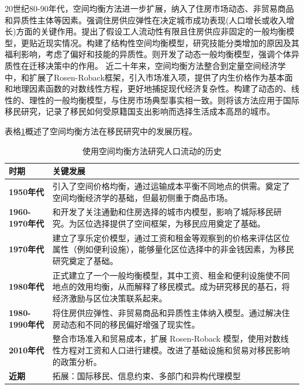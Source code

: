 \documentclass[a4paper, zihao=-4, fontset = mac, oneside]{ctexbook} %
\begin{document}
20世纪80-90年代，空间均衡方法进一步扩展，纳入了住房市场动态、非贸易商品和异质性主体等因素。\textcite{glaeserWealthCitiesAgglomeration2009}强调住房供应弹性在决定城市成功表现(人口增长或收入增长)方面的关键作用。\textcite{morettiLocalLaborMarkets2011}提出了假设工人流动性有限且住房供应非固定的一般均衡模型，更贴近现实情况。\textcite{diamondDeterminantsWelfareImplications2016}构建了结构性空间均衡模型，研究技能分类增加的原因及其福利影响，考虑了偏好和技能的异质性。\textcite{coen-piraniEffectHouseholdAppliances2010}则开发了动态一般均衡模型，强调个体异质性在迁移决策中的作用。
近二十年来，空间均衡方法整合到定量空间经济学中，\textcite{ahlfeldtEconomicsDensityEvidence2015}和\textcite{reddingQuantitativeSpatialEconomics2017}扩展了Rosen-Roback框架，引入市场准入项，提供了内生价格作为基本面和地理因素函数的对数线性方程，更好地捕捉现代经济复杂性。\textcite{glaeserHousingDynamicsUrban2014}构建了动态的、线性的、理性的一般均衡模型，与住房市场典型事实相一致。\textcite{albertImmigrationSpatialEquilibrium2022}则将该方法应用于国际移民研究，记录了移民如何受原籍国支出影响而选择生活成本高昂的城市。


表格\ref{tab:_history of spatial equilibrium on migratory problem}概述了空间均衡方法在移民研究中的发展历程。

\begin{table}[!ht]
\centering
\caption{使用空间均衡方法研究人口流动的历史}
\label{tab:_history of spatial equilibrium on migratory problem}
\begin{tabularx}{\textwidth}{@{}lX@{}}
\toprule
\textbf{时期} & \textbf{关键发展}\\
\midrule
\textbf{1950年代} & \textcite{samuelsonSpatialPriceEquilibrium1952}引入了空间价格均衡，通过运输成本平衡不同地点的供需。奠定了空间均衡经济学的基础，但最初侧重于商品市场。\\
\textbf{1960-1970年代} & \textcite{muthCitiesHousingSpatial1969}和\textcite{millsAggregativeModelResource1967}开发了关注通勤和住房选择的城市内模型，影响了城际移民研究。为区位选择提供了空间框架，为移民应用奠定了基础。\\
\textbf{1970年代} & \textcite{rosenHedonicPricesImplicit1974}建立了享乐定价模型，通过工资和租金等观察到的价格来评估区位属性（例如便利设施），能够量化区位选择中的非金钱因素，为移民研究奠定了基础。 \\
\textbf{1980年代} & \textcite{robackWagesRentsAmenities1988}正式建立了一个一般均衡模型，其中工资、租金和便利设施使不同地点的效用均衡，从而解释了移民模式。成为研究移民的基石，将经济激励与区位决策联系起来。\\
\textbf{1980-1990年代} & \textcite{glaeserWealthCitiesAgglomeration2009}将住房供应弹性、非贸易商品和异质性主体纳入模型。通过解决住房动态和不同的移民偏好增强了现实性。\\
\textbf{2010年代} & \cite{reddingQuantitativeSpatialEconomics2017}整合市场准入和贸易成本，扩展 Rosen-Roback 模型，使用对数线性方程对工资和人口进行建模。改进了基础设施和贸易对移民影响的政策分析。\\
\textbf{近期} & 拓展：国际移民、信息约束、多部门和异构代理模型 \\
\bottomrule
\end{tabularx}
\end{table}
\end{document}
